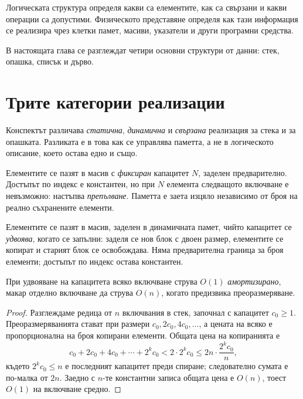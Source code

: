 Логическата структура определя какви са елементите, как са свързани и какви операции са допустими. Физическото представяне определя как тази информация се реализира чрез клетки памет, масиви, указатели и други програмни средства.

В настоящата глава се разглеждат четири основни структури от данни: стек, опашка, списък и дърво.

\section{Трите категории реализации}\label{s:18.2}

Конспектът различава \emph{статична}, \emph{динамична} и \emph{свързана}
реализация за стека и за опашката. Разликата е в това как се управлява паметта,
а не в логическото описание, което остава едно и също.

\begin{defn}
Елементите се пазят в масив с \emph{фиксиран} капацитет $N$, заделен предварително.
Достъпът по индекс е константен, но при $N$ елемента следващото включване е
невъзможно: настъпва \emph{препълване}. Паметта е заета изцяло независимо от
броя на реално съхранените елементи.
\end{defn}

\begin{defn}
Елементите се пазят в масив, заделен в динамичната памет, чийто капацитет се
\emph{удвоява}, когато се запълни: заделя се нов блок с двоен размер, елементите
се копират и старият блок се освобождава. Няма предварителна граница за броя
елементи; достъпът по индекс остава константен.
\end{defn}

\begin{prop}
При удвояване на капацитета всяко включване струва $O(1)$ \emph{амортизирано},
макар отделно включване да струва $O(n)$, когато предизвика преоразмеряване.
\end{prop}

\begin{proof}
Разглеждаме редица от $n$ включвания в стек, започнал с капацитет $c_0\ge 1$.
Преоразмеряванията стават при размери $c_0,2c_0,4c_0,\ldots$, а цената на всяко е
пропорционална на броя копирани елементи. Общата цена на копиранията е
\[
c_0+2c_0+4c_0+\cdots+2^kc_0
<2\cdot 2^kc_0\le 2n\cdot\frac{2^kc_0}{n},
\]
където $2^kc_0\le n$ е последният капацитет преди спиране; следователно сумата е
по-малка от $2n$. Заедно с $n$-те константни записа общата цена е $O(n)$, тоест
$O(1)$ на включване средно.
\end{proof}

